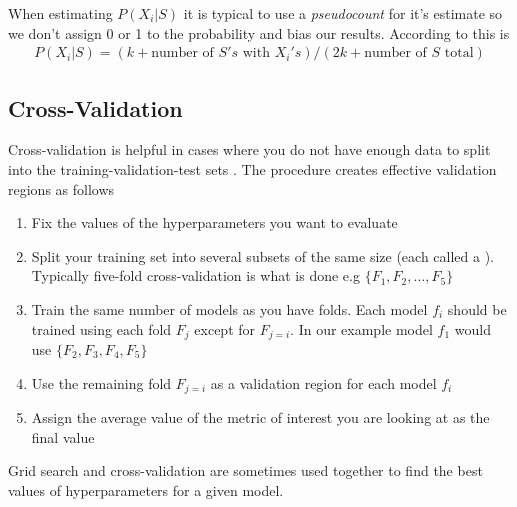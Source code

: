 When estimating $P(X_i|S)$ it is typical to use a \textit{pseudocount} for it's estimate so we don't assign 0 or 1 to the probability and bias our results. According to \cite{sutton} this is
\begin{align}
	P(X_i|S) = (k+\textrm{number~of~} S's\textrm{~with~} X_i's) / (2k+\textrm{number~of~} S \textrm{~total})
\end{align}

\subsection{Cross-Validation}
Cross-validation is helpful in cases where you do not have enough data to split into the training-validation-test sets \cite{burkov}. The procedure creates effective validation regions as follows

\begin{enumerate}
    \item Fix the values of the hyperparameters you want to evaluate
    \item Split your training set into several subsets of the same size (each called a ). Typically five-fold cross-validation is what is done e.g $\{F_1, F_2, \ldots, F_5\}$
    \item Train the same number of models as you have folds. Each model $f_i$ should be trained using each fold $F_j$ except for $F_{j=i}$. In our example model $f_1$ would use $\{F_2, F_3, F_4,F_5\}$
    \item Use the remaining fold $F_{j=i}$ as a validation region for each model $f_i$
    \item Assign the average value of the metric of interest you are looking at as the final value
\end{enumerate}
Grid search and cross-validation are sometimes used together to find the best values of hyperparameters for a given model.

%

